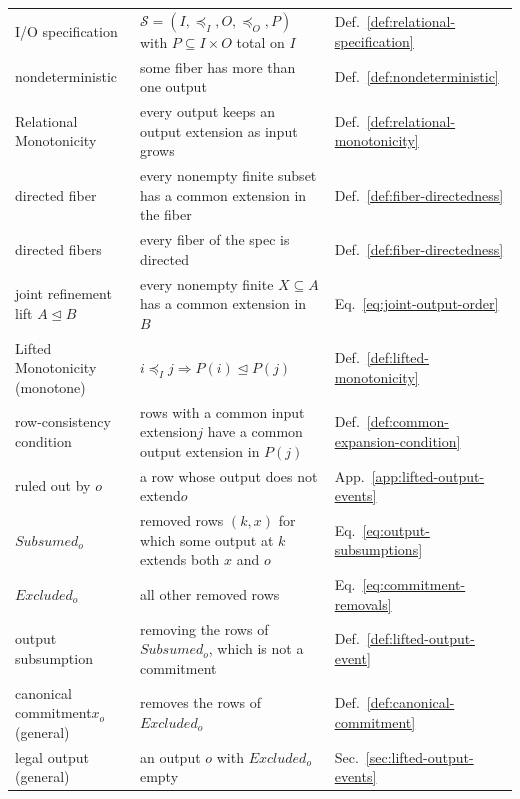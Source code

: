 \documentclass[sigconf]{cidr-2027}
\theoremstyle{remark}
\newcommand{\InputOrd}{\preceq_I}
\newcommand{\OutputOrd}{\preceq_O}
\newcommand{\commitment}{commitment\xspace}
\newcommand{\LiftedOrd}{\trianglelefteq}
\newcommand{\ingrows}{grows\xspace}          %
\newcommand{\indesc}{input extension\xspace} %
\newcommand{\outrel}{extends\xspace}          %
\newcommand{\outrelbase}{extend\xspace}       %
\newcommand{\outnoun}{output extension\xspace}%
\newcommand{\Spec}{\mathcal{S}}
\newcommand{\spectype}[1][]{I/O specification#1\xspace}
\newcommand{\fiber}[1]{P(#1)}
\newcommand{\Subsumed}{\mathit{Subsumed}}
\newcommand{\Excluded}{\mathit{Excluded}}
\begin{document}
{\medskip
\noindent
\begin{tabular}{@{}>{\raggedright\arraybackslash}p{}>{\raggedright\arraybackslash}p{}>{\raggedright\arraybackslash}p{}@{}}
  \toprule
  \multicolumn{3}{@{}l}{\textbf{Complete CALM (\S\ref{sec:complete-calm})}}\\
  \midrule
  \spectype & $\Spec=(I,\InputOrd,O,\OutputOrd,P)$ with $P\subseteq I\times O$ total on $I$ & Def.~\ref{def:relational-specification}\\
  nondeterministic & some fiber has more than one output & Def.~\ref{def:nondeterministic}\\
  Relational Monotonicity & every output keeps an \outnoun as input \ingrows & Def.~\ref{def:relational-monotonicity}\\
  directed fiber & every nonempty finite subset has a common extension in the fiber & Def.~\ref{def:fiber-directedness}\\
  directed fibers & every fiber of the spec is directed & Def.~\ref{def:fiber-directedness}\\
  joint refinement lift $A\LiftedOrd B$ & every nonempty finite $X\subseteq A$ has a common extension in $B$ & Eq.~\ref{eq:joint-output-order}\\
  Lifted Monotonicity (monotone) & $i\InputOrd j\Rightarrow\fiber{i}\LiftedOrd\fiber{j}$ & Def.~\ref{def:lifted-monotonicity}\\
  row-consistency condition & rows with a common \indesc $j$ have a common \outnoun in $\fiber{j}$ & Def.~\ref{def:common-expansion-condition}\\
  ruled out by $o$ & a row whose output does not \outrelbase $o$ & App.~\ref{app:lifted-output-events}\\
  $\Subsumed_o$ & removed rows $(k,x)$ for which some output at $k$ \outrel both $x$ and $o$ & Eq.~\ref{eq:output-subsumptions}\\
  $\Excluded_o$ & all other removed rows & Eq.~\ref{eq:commitment-removals}\\
  output subsumption & removing the rows of $\Subsumed_o$, which is not a \commitment & Def.~\ref{def:lifted-output-event}\\
  canonical \commitment $x_o$ (general) & removes the rows of $\Excluded_o$ & Def.~\ref{def:canonical-commitment}\\
  legal output (general) & an output $o$ with $\Excluded_o$ empty & Sec.~\ref{sec:lifted-output-events}\\
  \bottomrule
\end{tabular}

}
\end{document}
